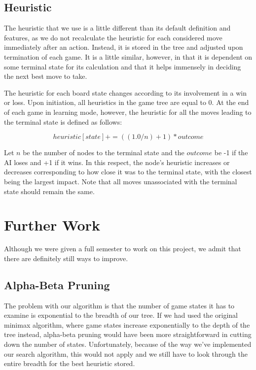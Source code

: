 \documentclass[preprint,12pt]{elsarticle}
\begin{document}
	\subsection{Heuristic}
		The heuristic that we use is a little different than its default definition and features, as we do not recalculate the heuristic for each considered move immediately after an action. Instead, it is stored in the tree and adjusted upon termination of each game. It is a little similar, however, in that it is dependent on some terminal state for its calculation and that it helps immensely in deciding the next best move to take.

		The heuristic for each board state changes according to its involvement in a win or loss. Upon initiation, all heuristics in the game tree are equal to 0. At the end of each game in learning mode, however, the heuristic for all the moves leading to the terminal state is defined as follows:

		\begin{equation}
			heuristic[state] += ((1.0/n) + 1) * outcome
		\end{equation}

		Let $n$ be the number of nodes to the terminal state and the $outcome$ be -1 if the AI loses and +1 if it wins. In this respect, the node's heuristic increases or decreases corresponding to how close it was to the terminal state, with the closest being the largest impact. Note that all moves unassociated with the terminal state should remain the same.

\section{Further Work}
	Although we were given a full semester to work on this project, we admit that there are definitely still ways to improve.

	\subsection{Alpha-Beta Pruning}
		The problem with our algorithm is that the number of game states it has to examine is exponential to the breadth of our tree. If we had used the original minimax algorithm, where game states increase exponentially to the depth of the tree instead, alpha-beta pruning would have been more straightforward in cutting down the number of states. Unfortunately, because of the way we've implemented our search algorithm, this would not apply and we still have to look through the entire breadth for the best heuristic stored.
\end{document}
